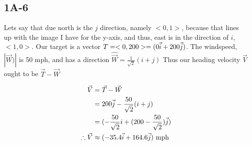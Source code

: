 \documentclass[main.tex]{subfiles}
\begin{document}
\subsection*{1A-6}

Lets say that due north is the $j$ direction, namely $<0,1>$,
because that lines up with the image I have for the y-axis, and
thus, east is in the direction of $i$, $<1,0>$.
Our target is a vector $T = <0, 200> = (0\vec{i} + 200\vec{j})$.
The windspeed, $|\vec{W})|$ is 50 mph, and has a direction $\hat{\vec
{W}} = \frac{1}{\sqrt{2}}(i + j)$
Thus our heading velocity $\vec{V}$ ought to be $\vec{T} - \vec{W}$

\begin{align}
\vec{V} &= \vec{T} - \vec{W}\\
&= 200\vec{j} - \frac{50}{\sqrt{2}}(i+j)\\
&= (- \frac{50}{\sqrt{2}}i + (200  - \frac{50}{\sqrt{2}}) \vec{j})\\
\therefore \vec{V} &\approx (- 35.4 \vec{i} + 164.6 \vec{j})\ \text{mph}
\end{align}
\end{document}
